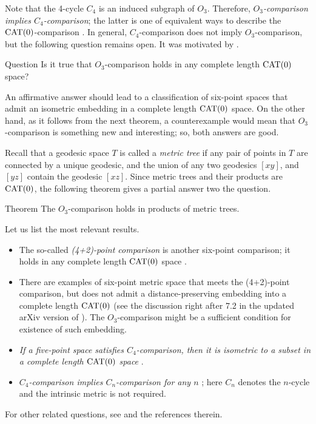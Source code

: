 \documentclass{article}
\begin{document}
Note that the 4-cycle $C_4$ is an induced subgraph of $O_3$.
Therefore, \textit{$O_3$-comparison implies $C_4$-comparison};
the latter is one of equivalent ways to describe the $\mathrm{CAT}(0)$-comparison \cite{alexander2019alexandrov}.
In general, $C_4$-comparison does not imply $O_3$-comparison,
but the following question remains open.
It was motivated by \cite[1.19$_+(e)$]{gromov}.

\begin{thm}{Question}
Is it true that $O_3$-comparison holds in any complete length $\mathrm{CAT}(0)$ space?
\end{thm}

An affirmative answer should lead to a classification of six-point spaces that admit an isometric embedding in a complete length $\mathrm{CAT}(0)$ space.
On the other hand, as it follows from the next theorem,
a counterexample would mean that $O_3$-comparison is something new and interesting;
so, both answers are good.

Recall that a geodesic space $T$ is called a \emph{metric tree} if any pair of points in $T$ are connected by a unique geodesic,
and the union of any two geodesics $[xy]$, and $[yz]$ contain the geodesic $[xz]$.
Since metric trees and their products are $\mathrm{CAT}(0)$, the following theorem gives a partial answer two the question.

\begin{thm}{Theorem}
The $O_3$-comparison holds in products of metric trees.
\end{thm}

Let us list the most relevant results.
\begin{itemize}
\item The so-called \emph{(4+2)-point comparison} is another six-point comparison;
it holds in any complete length $\mathrm{CAT}(0)$ space \cite{AKP-Kirszbraun,alexander2019alexandrov}.

\item There are examples of six-point metric space that meets the (4+2)-point comparison, but does not admit a distance-preserving embedding into a complete length $\mathrm{CAT}(0)$
(see the discussion right after 7.2 in the updated arXiv version of \cite{AKP-Kirszbraun}).
The $O_3$-comparison might be a sufficient condition for existence of such embedding.

\item \textit{If a five-point space satisfies $C_4$-comparison, then it is isometric to a subset in a complete length $\mathrm{CAT}(0)$ space} \cite{toyoda,lebedeva-petrunin}.

\item \textit{$C_4$-comparison implies $C_n$-comparison for any $n$} \cite{toyoda2019};
here $C_n$ denotes the $n$-cycle and the intrinsic metric is not required. 
\end{itemize}
For other related questions, see \cite{petrunin-2017,lebedeva-petrunin,lebedeva-petrunin-zolotov,lebedeva,lebedeva-petrunin-CBB,lebedeva-petrunin-graph-alexandrov, noar} and the references therein.
\end{document}
